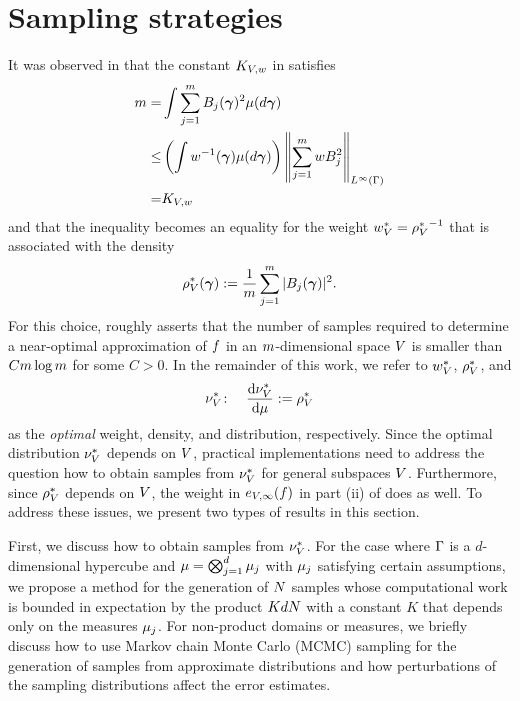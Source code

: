 
\section{Sampling strategies}
\label{sec:sampling}
It was observed in \cite{cohen2016optimal} that the constant $K_{V,w}$ in  satisfies
\begin{equation}
\label{eq:optimalK}
\aligned
m  = & \int \sum_{j=1}^{\dvsp} \onb_j(\psmi)^2 \measure(d\psmi)\\
\le & \left( \int  w^{-1}(\psmi) \measure(d\psmi) \right)  \left\| \sum_{j=1}^{\dvsp} w \onb_j^2 \right\|_{L^\infty(\domPS)} \\
 = & K_{\vsp,\weight}
\endaligned
\end{equation}
and that the inequality becomes an equality for the weight $w^{*}_{V}={\rho^{*}_{V}}^{-1}$ that is associated with the density
\begin{equation}
\label{eq:optimalmeasure}
\rho^{*}_{V}(\bm{\gamma}):=\frac{1}{m}\sum_{j=1}^{m}|B_j(\bm{\gamma})|^2.
\end{equation}
For this choice,  roughly asserts that the number of samples required to determine a near-optimal approximation of $f$ in an  $m$-dimensional space $V$ is smaller than $Cm \log m$ for some $C>0$. In the remainder of this work, we refer to $w^{*}_{V}$, $\rho^{*}_{V}$, and
\begin{equation}
\label{eq:optimaldistribution}
\nu^{*}_{V}\colon \quad \frac{\mathrm{d}\nu^{*}_{V}}{\text{d}\mu}:=\rho^{*}_{V}
\end{equation}
as the \emph{optimal} weight, density, and distribution, respectively.
Since the optimal distribution $\nu^{*}_{V}$ depends on $V$, practical implementations need to address the question how to obtain samples from $\nu^{*}_{V}$
 for general subspaces $V$. Furthermore, since $\rho^{*}_{V}$ depends on $V$, the weight in $e_{V,\infty}(f)$ in part (ii) of  does as well. To address these issues, we present two types of results in this section.

First, we discuss how to obtain samples from $\nu^{*}_{V}$.
For the case where $\Gamma$ is a $d$-dimensional hypercube and $\mu=\bigotimes_{j=1}^{d}\mu_{j}$ with $\mu_{j}$ satisfying certain assumptions, we propose a method for the generation of $N$ samples whose computational work is bounded in expectation by the product $KdN$ with a constant $K$ that depends only on the measures $\mu_{j}$.
For non-product domains or measures, we briefly discuss how to use Markov chain Monte Carlo (MCMC) sampling for the generation of samples from approximate distributions and how perturbations of the sampling distributions affect the error estimates.

